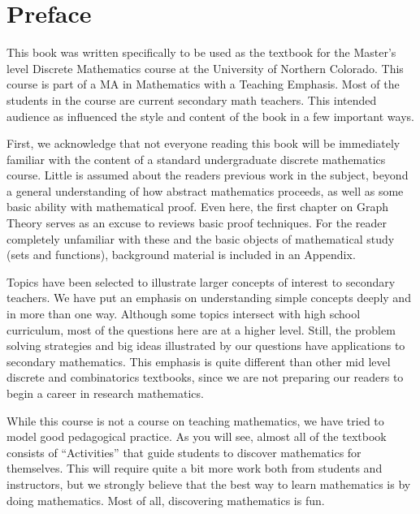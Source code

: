 \documentclass[10pt,]{book}
\theoremstyle{plain}
\theoremstyle{definition}
\theoremstyle{definition}
\theoremstyle{definition}
\numberwithin{equation}{chapter}
\begin{document}
\chapter*{Preface}\label{preface}
\hypertarget{p-5}{}%
This book was written specifically to be used as the textbook for the Master's level Discrete Mathematics course at the University of Northern Colorado.  This course is part of a MA in Mathematics with a Teaching Emphasis.  Most of the students in the course are current secondary math teachers.  This intended audience as influenced the style and content of the book in a few important ways.%
\par
\hypertarget{p-6}{}%
First, we acknowledge that not everyone reading this book will be immediately familiar with the content of a standard undergraduate discrete mathematics course.  Little is assumed about the readers previous work in the subject, beyond a general understanding of how abstract mathematics proceeds, as well as some basic ability with mathematical proof. Even here, the first chapter on Graph Theory serves as an excuse to reviews basic proof techniques.  For the reader completely unfamiliar with these and the basic objects of mathematical study (sets and functions), background material is included in an Appendix.%
\par
\hypertarget{p-7}{}%
Topics have been selected to illustrate larger concepts of interest to secondary teachers.  We have put an emphasis on understanding simple concepts deeply and in more than one way.  Although some topics intersect with high school curriculum, most of the questions here are at a higher level.  Still, the problem solving strategies and big ideas illustrated by our questions have applications to secondary mathematics.  This emphasis is quite different than other mid level discrete and combinatorics textbooks, since we are not preparing our readers to begin a career in research mathematics.%
\par
\hypertarget{p-8}{}%
While this course is not a course on teaching mathematics, we have tried to model good pedagogical practice.  As you will see, almost all of the textbook consists of ``Activities'' that guide students to discover mathematics for themselves.  This will require quite a bit more work both from students and instructors, but we strongly believe that the best way to learn mathematics is by doing mathematics.  Most of all, discovering mathematics is fun.%
\typeout{************************************************}
\typeout{************************************************}
\end{document}
